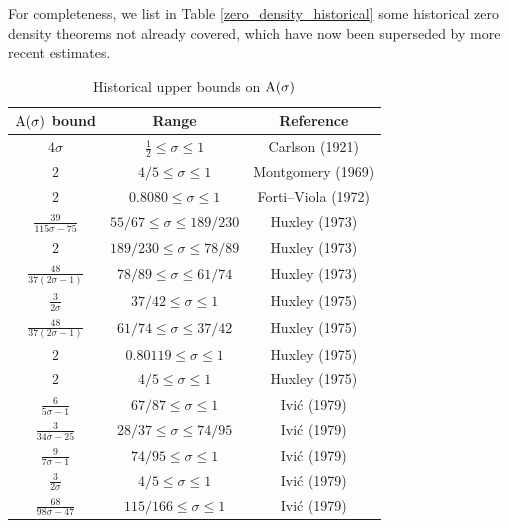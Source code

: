For completeness, we list in Table \ref{zero_density_historical} some historical zero density theorems not already covered, which have now been superseded by more recent estimates.

\begin{table}[ht]
    \def\arraystretch{1.3}
    \centering
    \caption{Historical upper bounds on $\mathrm{A}(\sigma)$}
    \begin{tabular}{|c|c|c|}
    \hline
    $\mathrm{A}(\sigma)$ bound & Range & Reference\\
    \hline
    $4\sigma$ & $\frac{1}{2} \leq \sigma \le 1$ & Carlson (1921) \cite{carlson_uber_1921}\\
    \hline
    $2$ & $4/5 \leq \sigma \leq 1$ & Montgomery (1969) \cite{montgomery_1969} \\
    \hline
    $2$ & $0.8080 \leq \sigma \leq 1$ & Forti--Viola (1972) \cite{forti-viola} \\
    \hline
    $\frac{39}{115\sigma-75}$ & $55/67 \leq \sigma \leq 189/230$ & Huxley (1973) \cite{huxley_large_1973} \\
    \hline
    $2$ & $189/230 \leq \sigma \leq 78/89$ & Huxley (1973) \cite{huxley_large_1973} \\
    \hline
    $\frac{48}{37(2\sigma-1)}$ & $78/89 \leq \sigma \leq 61/74$ & Huxley (1973) \cite{huxley_large_1973} \\
    \hline
    $\frac{3}{2\sigma}$ & $37/42 \leq \sigma \leq 1$ & Huxley (1975) \cite{huxley_large_1975a}\\
    \hline
    $\frac{48}{37(2\sigma-1)}$ & $61/74 \leq \sigma \leq 37/42$ & Huxley (1975) \cite{huxley_large_1975a}\\
    \hline
    $2$ & $0.80119 \leq \sigma \leq 1$ & Huxley (1975) \cite{huxley_large_1975a}\\
    \hline
    $2$ & $4/5 \leq \sigma \leq 1$ & Huxley (1975) \cite{huxley_large_1975b}\\
    \hline
    $\frac{6}{5\sigma-1}$ & $67/87 \leq \sigma \leq 1$ & Ivi\'c (1979) \cite{ivic_note_1979} \\
    \hline
    $\frac{3}{34\sigma-25}$ & $28/37 \leq \sigma \leq 74/95$ & Ivi\'c (1979) \cite{ivic_note_1979} \\
    \hline
    $\frac{9}{7\sigma-1}$ & $74/95 \leq \sigma \leq 1$ & Ivi\'c (1979) \cite{ivic_note_1979} \\
    \hline
    $\frac{3}{2\sigma}$ & $4/5 \leq \sigma \leq 1$ & Ivi\'c (1979) \cite{ivic_note_1979} \\
    \hline
    $\frac{68}{98\sigma-47}$ & $115/166 \leq \sigma \leq 1$ & Ivi\'c (1979) \cite{ivic_note_1979} \\

\end{tabular}
\end{table}

